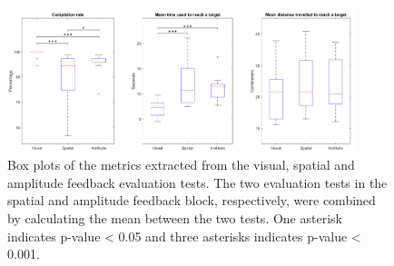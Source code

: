 \begin{figure}[h]                 
	\includegraphics[width=0.9\textwidth]{figures/boxplot_results}
	\caption{Box plots of the metrics extracted from the visual, spatial and amplitude feedback evaluation tests. The two evaluation tests in the spatial and amplitude feedback block, respectively, were combined by calculating the mean between the two tests. One asterisk indicates p-value < 0.05 and three asterisks indicates p-value < 0.001.}
	\label{fig:pa:boxplot_results} 
\end{figure}

